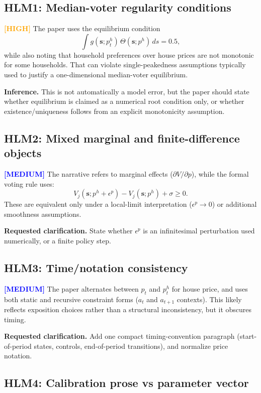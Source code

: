 \documentclass[11pt]{article}
\newcommand{\high}{\textcolor{orange}{\textbf{[HIGH]}}}
\newcommand{\medium}{\textcolor{blue}{\textbf{[MEDIUM]}}}
\begin{document}
\subsection*{HLM1: Median-voter regularity conditions}

\high{} The paper uses the equilibrium condition
\[
  \int g(\mathbf{s};p_t^h)\,\Theta(\mathbf{s};p^h)\,ds = 0.5,
\]
while also noting that household preferences over house prices are not monotonic for
some households. That can violate single-peakedness assumptions typically used to justify
a one-dimensional median-voter equilibrium.

\noindent\textbf{Inference.} This is not automatically a model error, but the paper should
state whether equilibrium is claimed as a numerical root condition only, or whether
existence/uniqueness follows from an explicit monotonicity assumption.

\subsection*{HLM2: Mixed marginal and finite-difference objects}

\medium{} The narrative refers to marginal effects (\(\partial V/\partial p\)), while
the formal voting rule uses:
\[
  V_j(\mathbf{s};p^h+\epsilon^p)-V_j(\mathbf{s};p^h)+\sigma \ge 0.
\]
These are equivalent only under a local-limit interpretation (\(\epsilon^p \to 0\)) or
additional smoothness assumptions.

\noindent\textbf{Requested clarification.} State whether \(\epsilon^p\) is an
infinitesimal perturbation used numerically, or a finite policy step.

\subsection*{HLM3: Time/notation consistency}

\medium{} The paper alternates between \(p_t\) and \(p_t^h\) for house price, and uses
both static and recursive constraint forms (\(a_t\) and \(a_{t+1}\) contexts). This likely
reflects exposition choices rather than a structural inconsistency, but it obscures timing.

\noindent\textbf{Requested clarification.} Add one compact timing-convention paragraph
(start-of-period states, controls, end-of-period transitions), and normalize price notation.

\subsection*{HLM4: Calibration prose vs parameter vector}
\end{document}

